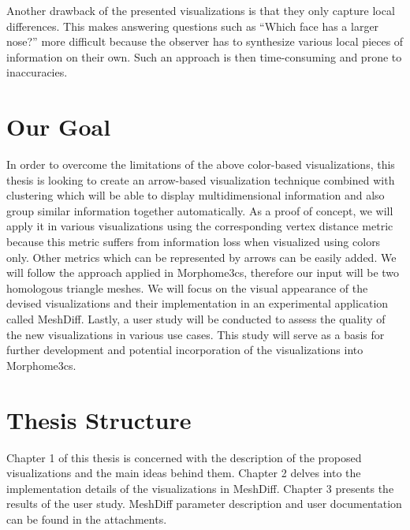 
Another drawback of the presented visualizations is that they only capture local differences. This makes answering questions such as ``Which face has a larger nose?'' more difficult because the observer has to synthesize various local pieces of information on their own. Such an approach is then time-consuming and prone to inaccuracies.
\section*{Our Goal}

In order to overcome the limitations of the above color-based visualizations, this thesis is looking to create an arrow-based visualization technique combined with clustering which will be able to display multidimensional information and also group similar information together automatically. As a proof of concept, we will apply it in various visualizations using the corresponding vertex distance metric because this metric suffers from information loss when visualized using colors only. Other metrics which can be represented by arrows can be easily added. We will follow the approach applied in Morphome3cs, therefore our input will be two homologous triangle meshes. We will focus on the visual appearance of the devised visualizations and their implementation in an experimental application called MeshDiff. Lastly, a user study will be conducted to assess the quality of the new visualizations in various use cases. This study will serve as a basis for further development and potential incorporation of the visualizations into Morphome3cs.
\section*{Thesis Structure}

Chapter 1 of this thesis is concerned with the description of the proposed visualizations and the main ideas behind them. Chapter 2 delves into the implementation details of the visualizations in MeshDiff. Chapter 3 presents the results of the user study. MeshDiff parameter description and user documentation can be found in the attachments.